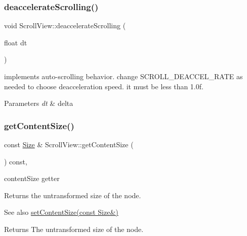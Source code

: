 \subsubsection{\texorpdfstring{deaccelerate\+Scrolling()}{deaccelerateScrolling()}\hspace{0.1cm}{\footnotesize\ttfamily [2/2]}}
{\footnotesize\ttfamily void Scroll\+View\+::deaccelerate\+Scrolling (\begin{DoxyParamCaption}\item[{float}]{dt }\end{DoxyParamCaption})\hspace{0.3cm}{\ttfamily [protected]}}

implements auto-\/scrolling behavior. change S\+C\+R\+O\+L\+L\+\_\+\+D\+E\+A\+C\+C\+E\+L\+\_\+\+R\+A\+TE as needed to choose deacceleration speed. it must be less than 1.\+0f.


\begin{DoxyParams}{Parameters}
{\em dt} & delta \\
\hline
\end{DoxyParams}
\mbox{\label{classScrollView_a137f08e58505c253a4c3274c426200b2}} 
\subsubsection{\texorpdfstring{get\+Content\+Size()}{getContentSize()}\hspace{0.1cm}{\footnotesize\ttfamily [1/2]}}
{\footnotesize\ttfamily const \hyperlink{classSize}{Size} \& Scroll\+View\+::get\+Content\+Size (\begin{DoxyParamCaption}{ }\end{DoxyParamCaption}) const\hspace{0.3cm}{\ttfamily [override]}, {\ttfamily [virtual]}}



content\+Size getter 

Returns the untransformed size of the node.

\begin{DoxySeeAlso}{See also}
{\ttfamily \hyperlink{classScrollView_a3cf1d7fd072898e64498a7dc9c5932c1}{set\+Content\+Size(const Size\&)}}
\end{DoxySeeAlso}
\begin{DoxyReturn}{Returns}
The untransformed size of the node. 
\end{DoxyReturn}



